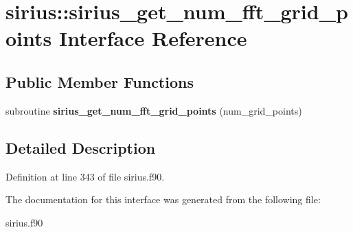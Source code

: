 \hypertarget{interfacesirius_1_1sirius__get__num__fft__grid__points}{}\section{sirius\+:\+:sirius\+\_\+get\+\_\+num\+\_\+fft\+\_\+grid\+\_\+points Interface Reference}
\label{interfacesirius_1_1sirius__get__num__fft__grid__points}
\subsection*{Public Member Functions}
\begin{DoxyCompactItemize}
\item 
\hypertarget{interfacesirius_1_1sirius__get__num__fft__grid__points_a8df06ab8dba67cb603812a11b732f7eb}{}subroutine {\bfseries sirius\+\_\+get\+\_\+num\+\_\+fft\+\_\+grid\+\_\+points} (num\+\_\+grid\+\_\+points)\label{interfacesirius_1_1sirius__get__num__fft__grid__points_a8df06ab8dba67cb603812a11b732f7eb}

\end{DoxyCompactItemize}


\subsection{Detailed Description}


Definition at line 343 of file sirius.\+f90.



The documentation for this interface was generated from the following file\+:\begin{DoxyCompactItemize}
\item 
sirius.\+f90\end{DoxyCompactItemize}
